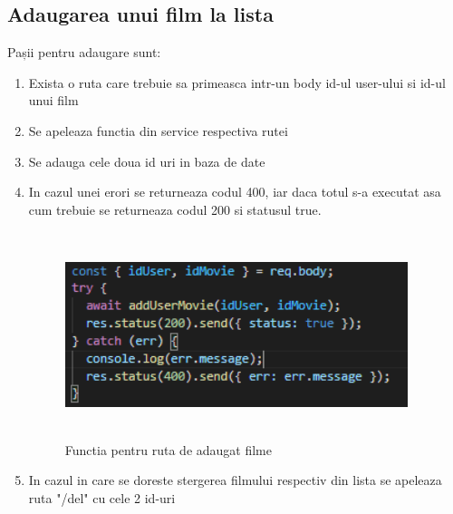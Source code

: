 \subsection{Adaugarea unui film la lista}
\par Pașii pentru adaugare sunt:
\begin{enumerate}
  	\item Exista o ruta care trebuie sa primeasca intr-un body id-ul user-ului si id-ul unui film
  	\item Se apeleaza functia din service respectiva rutei
	\item Se adauga cele doua id uri in baza de date
  	\item In cazul unei erori se returneaza codul 400, iar daca totul s-a executat asa cum trebuie se returneaza codul 200 si statusul true.
		\begin{figure}[htbp]
			\centerline{\includegraphics[width=10cm, height=6cm]{figures/adaugare film lista.png}}
			\caption{Functia pentru ruta de adaugat filme}
			\label{fig}
		\end{figure}	
	\item In cazul in care se doreste stergerea filmului respectiv din lista se apeleaza ruta "/del" cu cele 2 id-uri
\end{enumerate}


